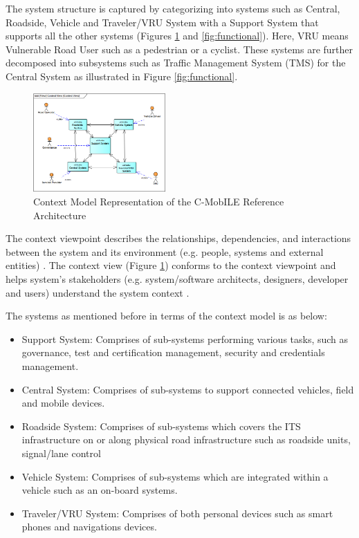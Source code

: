 \documentclass[conference]{IEEEtran}
\begin{document}
The system structure is captured by categorizing into systems such as Central, Roadside, Vehicle and Traveler/VRU System with a Support System that supports all the other systems (Figures \ref{fig:contextviewpoint} and \ref{fig:functional}). Here, VRU means Vulnerable Road User such as a pedestrian or a cyclist. These systems are further decomposed into subsystems such as Traffic Management System (TMS) for the Central System as illustrated in Figure \ref{fig:functional}.

\begin{figure}[ht!]
	\centering
	\includegraphics[width=0.45\textwidth]{context}
	\caption{Context Model Representation of the C-MobILE Reference Architecture}
	\label{fig:contextviewpoint}
	\centering
\end{figure}
The context viewpoint describes the relationships, dependencies, and interactions between the system and its environment (e.g. people,
systems and external entities) \cite{sysml}. The context view (Figure \ref{fig:contextviewpoint}) conforms to the context viewpoint and helps system’s stakeholders (e.g. system/software architects, designers, developer and users) understand the system context \cite{d31}.

The systems as mentioned before in terms of the context model is as below:

\begin{itemize}
	\item Support System: Comprises of sub-systems performing various tasks, such as governance, test and certification management, security and credentials management.
	\item Central System: Comprises of sub-systems to support connected vehicles, field and mobile devices.
	\item Roadside System: Comprises of sub-systems which covers the ITS infrastructure on or along physical road infrastructure such as roadside units, signal/lane control 
	\item Vehicle System: Comprises of sub-systems which are integrated within a vehicle such as an on-board systems.
	\item Traveler/VRU System: Comprises of both personal devices such as smart phones and navigations devices.
\end{itemize}
\end{document}
